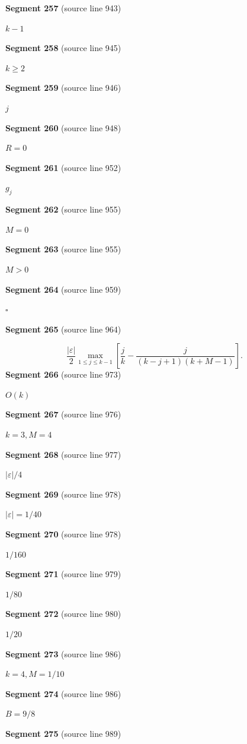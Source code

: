\documentclass[11pt]{article}
\begin{document}
\textbf{Segment 257} (source line 943)\par
\( k-1 \)\par
\textbf{Segment 258} (source line 945)\par
\( k\ge2 \)\par
\textbf{Segment 259} (source line 946)\par
\( j \)\par
\textbf{Segment 260} (source line 948)\par
\( R=0 \)\par
\textbf{Segment 261} (source line 952)\par
\( g_j \)\par
\textbf{Segment 262} (source line 955)\par
\( M=0 \)\par
\textbf{Segment 263} (source line 955)\par
\( M>0 \)\par
\textbf{Segment 264} (source line 959)\par
\( \square \)\par
\textbf{Segment 265} (source line 964)\par
\[
\frac{|\varepsilon|}{2}
\max_{1\le j\le k-1}
\left[
\frac jk-\frac{j}{(k-j+1)(k+M-1)}
\right].
\tag{20}
\]
\textbf{Segment 266} (source line 973)\par
\( O(k) \)\par
\textbf{Segment 267} (source line 976)\par
\( k=3,M=4 \)\par
\textbf{Segment 268} (source line 977)\par
\( |\varepsilon|/4 \)\par
\textbf{Segment 269} (source line 978)\par
\( |\varepsilon|=1/40 \)\par
\textbf{Segment 270} (source line 978)\par
\( 1/160 \)\par
\textbf{Segment 271} (source line 979)\par
\( 1/80 \)\par
\textbf{Segment 272} (source line 980)\par
\( 1/20 \)\par
\textbf{Segment 273} (source line 986)\par
\( k=4,M=1/10 \)\par
\textbf{Segment 274} (source line 986)\par
\( B=9/8 \)\par
\textbf{Segment 275} (source line 989)\par
\end{document}
